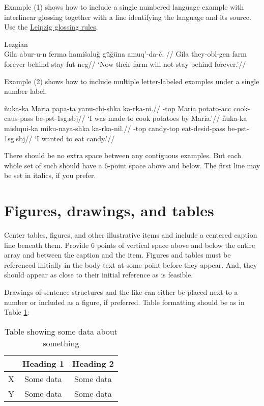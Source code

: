 \documentclass[12pt,letterpaper]{article}
\begin{document}
Example (1) shows how to include a single numbered language example with interlinear glossing together with a line identifying the language and its source. Use the \href{http://www.eva.mpg.de/lingua/resources/glossing-rules.php}{Leipzig glossing rules}.

\pex[everygla={},aboveglftskip=0em]
\begingl\label{Lezgian}Lezgian \citep[from][207]{haspelmath_1993}\\
\gla Gila abur-u-n ferma hami\v{s}alu\u{g} g\"{u}\u{g}\"{u}na amuq’-da-\v{c}. //
\glb Gila they-{\sc obl}-{\sc gen} farm forever behind stay-{\sc fut}-{\sc neg}//
\glft ‘Now their farm will not stay behind forever.’//
\endgl
\xe

Example  (2) shows how to include multiple letter-labeled examples under a single number label.

\pex[everygla={},aboveglftskip=0em]
\a \begingl
\gla \~nuka-ka Maria papa-ta yanu-chi-shka ka-rka-ni.//
-{\sc top} Maria potato-{\sc acc} cook-{\sc caus}-{\sc pass} be-{\sc pst}-{\sc 1sg.sbj}//
\glft ‘I was made to cook potatoes by Maria.’//
\endgl
\a \begingl
\gla *\~nuka-ka mishqui-ka miku-naya-shka ka-rka-nil.//
-{\sc top} candy-{\sc top} eat-{\sc desid}-{\sc pass} be-{\sc pst}-1{\sc sg.sbj}//
\glft ‘I wanted to eat candy.’//
\endgl
\xe

There should be no extra space between any contiguous examples. But each whole set of such should have a 6-point space above and below. The first line may be set in italics, if you prefer.
 
\section{Figures, drawings, and tables}

Center tables, figures, and other illustrative items and include a centered caption line beneath them. Provide 6 points of vertical space above and below the entire array and between the caption and the item. Figures and tables must be referenced initially in the body text at some point before they appear. And, they should appear as close to their initial reference as is feasible.

Drawings of sentence structures and the like can either be placed next to a number or included as a figure, if preferred. Table formatting should be as in Table \ref{t:table}: 

\begin{table}[h]
\centering
	\begin{tabular}{l c c}
	& Heading 1 & Heading 2\\
	\hline
	X &  Some data & Some data\\
	Y & Some data & Some data \\
	\hline
	\end{tabular}
\caption{Table showing some data about something \label{t:table}}
\end{table}
\end{document}
